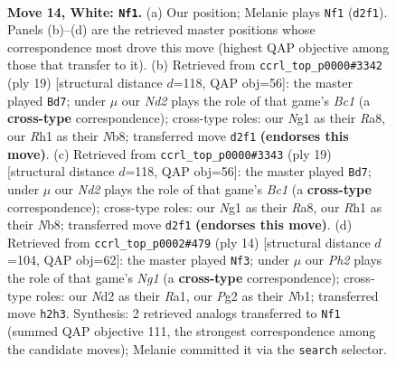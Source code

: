 \documentclass[11pt]{article}
\begin{document}
\clearpage

\begin{figure}[p]\centering
\begin{subfigure}{0.46\textwidth}\centering
\resizebox{\linewidth}{!}{%
\newchessgame
\chessboard[
  setfen={r1bqk3/pp1n1pp1/4p3/2bpP3/Q2n1P1r/P7/1P1N2PP/R1B1K1NR w KQq - 1 14},
  showmover=false,
  pgfstyle=straightmove, color=movearrow, markmove={d2-f1}
]}
\caption{}
\end{subfigure}\hfill
\begin{subfigure}{0.46\textwidth}\centering
\resizebox{\linewidth}{!}{%
\newchessgame
\chessboard[
  setfen={rnb1k1nr/pp4pp/5q2/1B1p2N1/1b1Pp3/2N5/PP3PPP/R1BQK2R b KQkq - 1 10},
  showmover=false,
  pgfstyle=straightmove, color=movearrow, markmove={c8-d7}
]}
\caption{}
\end{subfigure}
\\[4pt]
\begin{subfigure}{0.46\textwidth}\centering
\resizebox{\linewidth}{!}{%
\newchessgame
\chessboard[
  setfen={rnb1k1nr/pp4pp/5q2/1B1p2N1/1b1Pp3/2N5/PP3PPP/R1BQK2R b KQkq - 1 10},
  showmover=false,
  pgfstyle=straightmove, color=movearrow, markmove={c8-d7}
]}
\caption{}
\end{subfigure}\hfill
\begin{subfigure}{0.46\textwidth}\centering
\resizebox{\linewidth}{!}{%
\newchessgame
\chessboard[
  setfen={rn1qkb1r/ppp2ppp/4p3/3nP3/5P2/3Q4/PPP3PP/RNB1K1NR w KQkq - 0 8},
  showmover=false,
  pgfstyle=straightmove, color=movearrow, markmove={g1-f3}
]}
\caption{}
\end{subfigure}
\caption{\textbf{Move 14, White: \texttt{Nf1}.} (a) Our position; Melanie plays \texttt{Nf1} (\texttt{d2f1}). Panels (b)--(d) are the retrieved master positions whose correspondence most drove this move (highest QAP objective among those that transfer to it). (b) Retrieved from \texttt{ccrl\_top\_p0000\#3342} (ply 19) [structural distance $d$=118, QAP obj=56]: the master played \texttt{Bd7}; under $\mu$ our \emph{Nd2} plays the role of that game's \emph{Bc1} (a \textbf{cross-type} correspondence); cross-type roles: our \emph{N}g1 as their \emph{R}a8, our \emph{R}h1 as their \emph{N}b8; transferred move \texttt{d2f1} \textbf{(endorses this move)}. (c) Retrieved from \texttt{ccrl\_top\_p0000\#3343} (ply 19) [structural distance $d$=118, QAP obj=56]: the master played \texttt{Bd7}; under $\mu$ our \emph{Nd2} plays the role of that game's \emph{Bc1} (a \textbf{cross-type} correspondence); cross-type roles: our \emph{N}g1 as their \emph{R}a8, our \emph{R}h1 as their \emph{N}b8; transferred move \texttt{d2f1} \textbf{(endorses this move)}. (d) Retrieved from \texttt{ccrl\_top\_p0002\#479} (ply 14) [structural distance $d$=104, QAP obj=62]: the master played \texttt{Nf3}; under $\mu$ our \emph{Ph2} plays the role of that game's \emph{Ng1} (a \textbf{cross-type} correspondence); cross-type roles: our \emph{N}d2 as their \emph{R}a1, our \emph{P}g2 as their \emph{N}b1; transferred move \texttt{h2h3}. Synthesis: 2 retrieved analogs transferred to \texttt{Nf1} (summed QAP objective 111, the strongest correspondence among the candidate moves); Melanie committed it via the \texttt{search} selector.}
\label{fig:thought-m26}
\end{figure}
\end{document}
